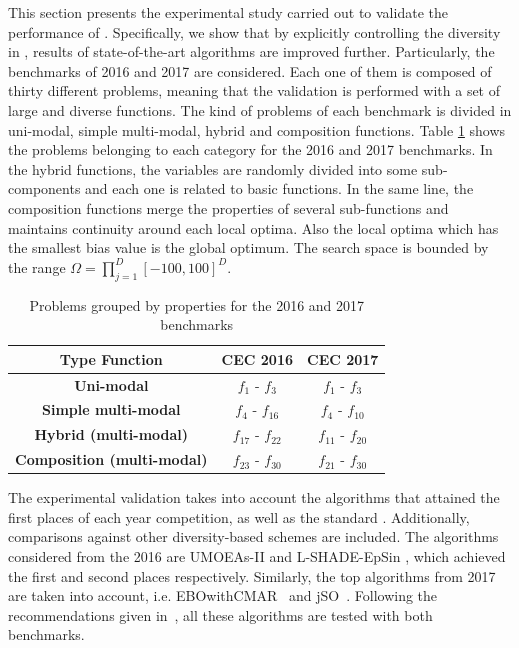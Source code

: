 This section presents the experimental study carried out to validate the performance of \DEEDM{}.
%
Specifically, we show that by explicitly controlling the diversity in \DE{}, results of state-of-the-art algorithms
are improved further.
%
Particularly, the benchmarks of \CEC{} 2016 and \CEC{} 2017 are considered.
%
Each one of them is composed of thirty different problems, meaning that the validation is performed with a set of large and diverse
functions.
%
The kind of problems of each benchmark is divided in uni-modal, 
simple multi-modal, hybrid and composition functions.
%
Table \ref{tab:category} shows the problems belonging to each category for the \CEC{} 2016 and \CEC{} 2017 benchmarks.
%
%
In the hybrid functions, the variables are randomly divided into some sub-components and each one is related to basic functions.
%
In the same line, the composition functions merge the properties of several sub-functions and maintains continuity around each local optima.
%
Also the local optima which has the smallest bias value is the global optimum.
%
The search space is bounded by the range $\Omega = \prod_{j=1}^D[-100, 100]^D$.

\begin{table}[t]
\centering
\begin{tabular}{|c|c|c|}
\hline
\textbf{Type Function} & \textbf{CEC 2016} & \textbf{CEC 2017} \\ \hline
\textbf{Uni-modal} & $f_1$ - $f_3$ & $f_1$ - $f_3$ \\ \hline
\textbf{Simple multi-modal} & $f_4$ - $f_{16}$ & $f_4$ - $f_{10}$ \\ \hline
\textbf{Hybrid (multi-modal)} & $f_{17}$ - $f_{22}$ & $f_{11}$ - $f_{20}$ \\ \hline
\textbf{Composition (multi-modal)} & $f_{23}$ - $f_{30}$ & $f_{21}$ - $f_{30}$ \\ \hline
\end{tabular}
\caption{Problems grouped by properties for the \CEC{} 2016 and \CEC{} 2017 benchmarks}\label{tab:category}
\end{table}
%
The experimental validation takes into account the algorithms that attained the first places of each year competition,
as well as the standard \DE{}.
%
Additionally, comparisons against other diversity-based schemes are included.
%
The algorithms considered from the \CEC{} 2016 are UMOEAs-II \cite{elsayed2016testing} and L-SHADE-EpSin \cite{awad2016ensemble}, 
which achieved the first and second places respectively.
%
Similarly, the top algorithms from \CEC{} 2017 are taken into account, i.e. EBOwithCMAR~\cite{kumar2017improving} 
and jSO~\cite{brest2017single}.
%
%
%
Following the recommendations given in~\cite{molina2017analysis}, all these algorithms are tested with both benchmarks.

